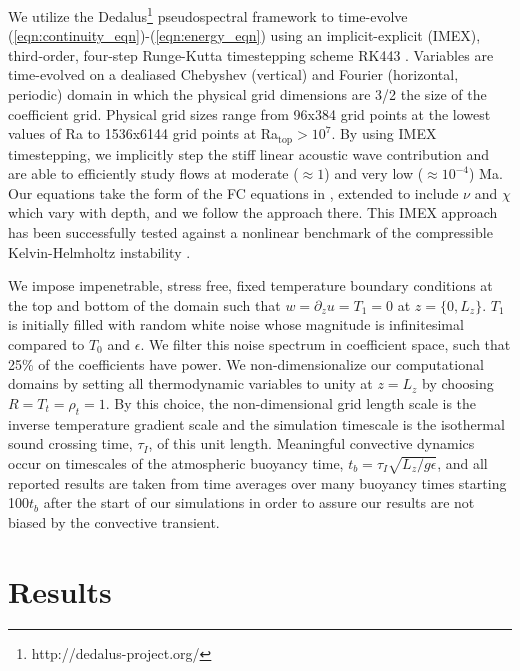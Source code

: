 \documentclass[aps, prl, twocolumn, nofootinbib, groupedaddress, amsfonts, amssymb, amsmath]{revtex4-1}
\begin{document}
We utilize the 
Dedalus\footnote{http://dedalus-project.org/} \cite{burns&all2016} 
pseudospectral framework to time-evolve  
(\ref{eqn:continuity_eqn})-(\ref{eqn:energy_eqn}) 
using an implicit-explicit (IMEX), third-order, four-step 
Runge-Kutta timestepping scheme RK443 \cite{ascher&all1997}.  
Variables are time-evolved on a dealiased Chebyshev (vertical)
and Fourier (horizontal, periodic) domain in which the
physical grid dimensions are 3/2 the size of the coefficient grid.  
Physical grid sizes range from
96x384 grid points at the lowest values of 
Ra to 1536x6144 grid points at Ra$_{\text{top}} > 10^{7}$. 
By using IMEX timestepping, we implicitly step the 
stiff linear acoustic wave contribution and are able to
efficiently study flows at moderate ($\approx 1$) 
and very low ($\approx 10^{-4}$) Ma.  Our equations take the form
of the FC equations in \cite{lecoanet&all2014}, extended to include
$\nu$ and $\chi$ which vary with depth, and we follow the approach there.
This IMEX approach has been successfully 
tested against a nonlinear benchmark  of the compressible 
Kelvin-Helmholtz instability \cite{Lecoanet_et_al_2016_KH}.

We impose impenetrable, stress free, fixed temperature boundary conditions at
the top and bottom of the domain such that 
$w = \partial_z u = T_1 = 0$ at $z = \{0, L_z\}$. 
$T_1$ is initially filled with
random white noise whose magnitude is infinitesimal
compared to $T_0$ and $\epsilon$.
We filter this noise spectrum in coefficient space, 
such that 25\% of the coefficients
have power. We non-dimensionalize our computational domains by setting
all thermodynamic variables to unity at $z = L_z$ by choosing
$R = T_t = \rho_t = 1$.  By this choice, the non-dimensional
grid length scale is the inverse temperature gradient scale and the 
simulation timescale is the isothermal sound crossing time, 
$\tau_I$, of this unit length.
Meaningful convective dynamics occur on 
timescales of the atmospheric buoyancy time,
$t_b = \tau_I \sqrt{L_z/g\epsilon}$, 
and all reported results are taken from time averages
over many buoyancy times starting 100$t_b$ 
after the start of our simulations in order to
assure our results are not biased by the convective transient.

\section{Results}
\label{sec:results}
\end{document}
